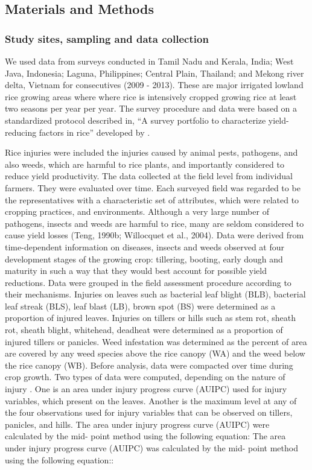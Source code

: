 \subsection{Materials and Methods}

\subsubsection{Study sites, sampling and data collection}
We used data from surveys conducted in Tamil Nadu  and Kerala, India; West Java, Indonesia; Laguna, Philippines; Central Plain, Thailand; and Mekong river delta, Vietnam for consecutives (2009 - 2013). These are major irrigated lowland rice growing areas where where rice is intensively cropped growing rice at least two seasons per year per year. The survey procedure and data were based on a standardized protocol described  in, ``A survey portfolio to characterize yield-reducing factors in rice'' developed by \citet{Savarysurvey2009}.

Rice injuries were included the injuries caused by animal pests, pathogens, and also weeds, which are harmful to rice plants, and importantly considered to reduce yield productivity. The data collected at the field level from individual farmers. They were evaluated over time. Each surveyed field was regarded to be the representatives with a characteristic set of attributes, which were related to cropping practices, and environments. Although a very large number of pathogens, insects and weeds are harmful to rice, many are seldom considered to cause yield losses (Teng, 1990b; Willocquet et al., 2004). Data were derived from time-dependent information on diseases, insects and weeds observed at four development stages of the growing crop: tillering, booting, early dough and maturity in such a way that they would best account for possible yield reductions. Data were grouped in the field assessment procedure according to their mechanisms. Injuries on leaves such as bacterial leaf blight (BLB), bacterial leaf streak (BLS), leaf blast (LB), brown spot (BS) were determined as a proportion of injured leaves. Injuries on tillers or hills such as stem rot, sheath rot, sheath blight, whitehead, deadheat were determined as a proportion of injured tillers or panicles. Weed infestation was determined as the percent of area are covered by any weed species above the rice canopy (WA) and the weed below the rice canopy (WB). Before analysis, data were compacted over time during crop growth. Two types of data were computed, depending on the nature of injury . One is an area under injury progress curve (AUIPC) used for injury variables, which present on the leaves. Another is the maximum level at any of the four observations used for injury variables that can be observed on tillers, panicles, and hills. The area under injury progress curve (AUIPC) \citep{Campbell_1990_Introduction} were calculated by the mid- point method using the following equation: The area under injury progress curve (AUIPC) was calculated by the mid- point method using the following equation::

